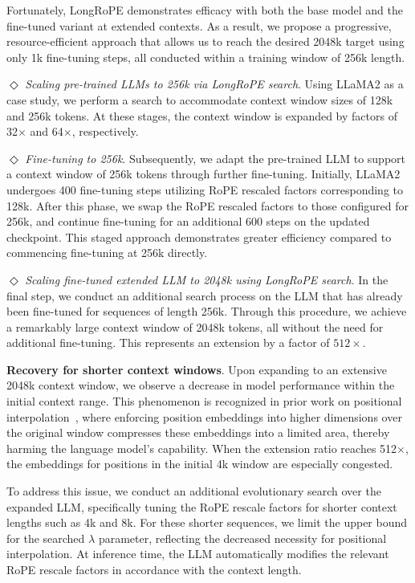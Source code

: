 Fortunately, LongRoPE demonstrates efficacy with both the base model and the fine-tuned variant at extended contexts. As a result, we propose a progressive, resource-efficient approach that allows us to reach the desired 2048k target using only 1k fine-tuning steps, all conducted within a training window of 256k length.

$\Diamond$ \textit{Scaling pre-trained LLMs to 256k via LongRoPE search}. Using LLaMA2 as a case study, we perform a search to accommodate context window sizes of 128k and 256k tokens. At these stages, the context window is expanded by factors of 32$\times$ and 64$\times$, respectively.

$\Diamond$ \textit{Fine-tuning to 256k}. Subsequently, we adapt the pre-trained LLM to support a context window of 256k tokens through further fine-tuning. Initially, LLaMA2 undergoes 400 fine-tuning steps utilizing RoPE rescaled factors corresponding to 128k. After this phase, we swap the RoPE rescaled factors to those configured for 256k, and continue fine-tuning for an additional 600 steps on the updated checkpoint. This staged approach demonstrates greater efficiency compared to commencing fine-tuning at 256k directly.

$\Diamond$ \textit{Scaling fine-tuned extended LLM to 2048k using LongRoPE search}. In the final step, we conduct an additional search process on the LLM that has already been fine-tuned for sequences of length 256k. Through this procedure, we achieve a remarkably large context window of 2048k tokens, all without the need for additional fine-tuning. This represents an extension by a factor of $512\times$.

\textbf{Recovery for shorter context windows}. Upon expanding to an extensive 2048k context window, we observe a decrease in model performance within the initial context range. This phenomenon is recognized in prior work on positional interpolation~\cite{pi}, where enforcing position embeddings into higher dimensions over the original window compresses these embeddings into a limited area, thereby harming the language model's capability. When the extension ratio reaches 512$\times$, the embeddings for positions in the initial 4k window are especially congested.

To address this issue, we conduct an additional evolutionary search over the expanded LLM, specifically tuning the RoPE rescale factors for shorter context lengths such as 4k and 8k. For these shorter sequences, we limit the upper bound for the searched $\lambda$ parameter, reflecting the decreased necessity for positional interpolation. At inference time, the LLM automatically modifies the relevant RoPE rescale factors in accordance with the context length.

